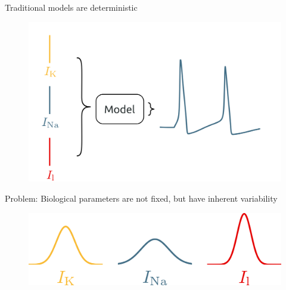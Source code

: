 \documentclass[presentation]{beamer}
\begin{document}

\begin{frame}{Traditional models are deterministic}
    \begin{figure}
       \includegraphics[width=1.1\textwidth]{deterministic.png}

    \end{figure}
\end{frame}


\begin{frame}{Problem: Biological parameters are not fixed, but have inherent variability}
    \begin{figure}
\includegraphics[width=1\textwidth]{distributions.png}
\end{figure}
\end{frame}
\end{document}
